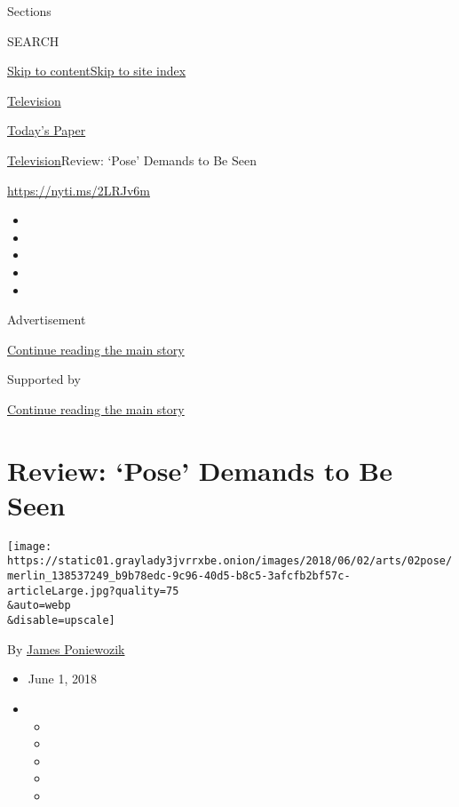 Sections

SEARCH

\protect\hyperlink{site-content}{Skip to
content}\protect\hyperlink{site-index}{Skip to site index}

\href{https://www.nytimes3xbfgragh.onion/section/arts/television}{Television}

\href{https://myaccount.nytimes3xbfgragh.onion/auth/login?response_type=cookie\&client_id=vi}{}

\href{https://www.nytimes3xbfgragh.onion/section/todayspaper}{Today's
Paper}

\href{/section/arts/television}{Television}\textbar{}Review: `Pose'
Demands to Be Seen

\url{https://nyti.ms/2LRJv6m}

\begin{itemize}
\item
\item
\item
\item
\item
\end{itemize}

Advertisement

\protect\hyperlink{after-top}{Continue reading the main story}

Supported by

\protect\hyperlink{after-sponsor}{Continue reading the main story}

\hypertarget{review-pose-demands-to-be-seen}{%
\section{Review: `Pose' Demands to Be
Seen}\label{review-pose-demands-to-be-seen}}

\texttt{[image: https://static01.graylady3jvrrxbe.onion/images/2018/06/02/arts/02pose/merlin\_138537249\_b9b78edc-9c96-40d5-b8c5-3afcfb2bf57c-articleLarge.jpg?quality=75\\\&auto=webp\\\&disable=upscale]}

By \href{https://www.nytimes3xbfgragh.onion/by/james-poniewozik}{James
Poniewozik}

\begin{itemize}
\item
  June 1, 2018
\item
  \begin{itemize}
  \item
  \item
  \item
  \item
  \item
  \end{itemize}
\end{itemize}

